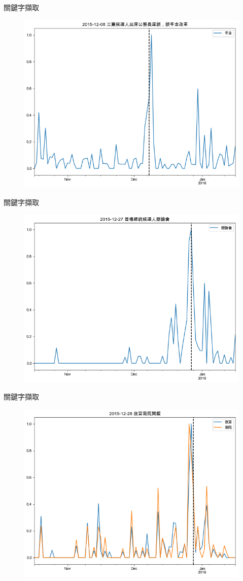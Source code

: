 \documentclass{beamer}
\begin{document}
\begin{CJK}{UTF8}{bkai}
\begin{frame}{關鍵字擷取}
\begin{figure}
  \includegraphics[width=.7\textwidth, height=.7\textheight, keepaspectratio]{ts09}
\end{figure}
\end{frame}

\begin{frame}{關鍵字擷取}
\begin{figure}
  \includegraphics[width=.7\textwidth, height=.7\textheight, keepaspectratio]{ts10}
\end{figure}
\end{frame}

\begin{frame}{關鍵字擷取}
\begin{figure}
  \includegraphics[width=.7\textwidth, height=.7\textheight, keepaspectratio]{ts11}
\end{figure}
\end{frame}


\end{CJK}
\end{document}

